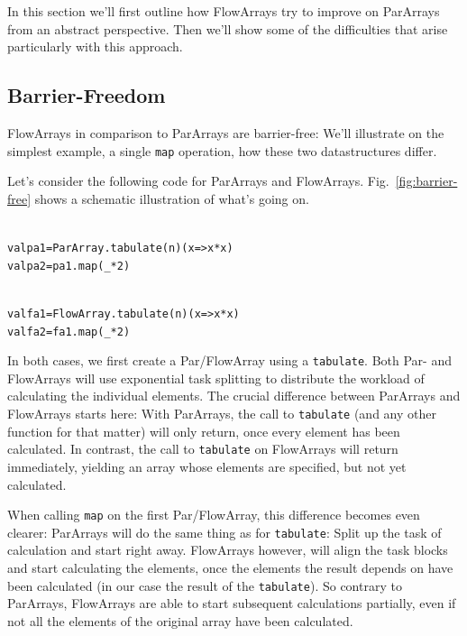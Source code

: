\documentclass[runningheads,a4paper,fleqn]{llncs}
\begin{document}
In this section we'll first outline how FlowArrays try to improve on
ParArrays from an abstract perspective. Then we'll show some of the
difficulties that arise particularly with this approach.

\subsection{Barrier-Freedom}
FlowArrays in comparison to ParArrays are barrier-free: We'll
illustrate on the simplest example, a single \texttt{map}
operation, how these two datastructures differ.

Let's consider the following code for ParArrays and
FlowArrays. Fig.~\ref{fig:barrier-free} shows a schematic
illustration of what's going on.

\noindent
\begin{minipage}[t]{.5\textwidth}
\begin{alltt}
{\scriptsize
val pa1 = ParArray.tabulate(n)(x => x*x)
val pa2 = pa1.map(_ * 2)
}
\end{alltt}
\end{minipage}
\begin{minipage}[t]{.5\textwidth}
\begin{alltt}
{\scriptsize
val fa1 = FlowArray.tabulate(n)(x => x*x)
val fa2 = fa1.map(_ * 2)
}
\end{alltt}
\end{minipage}

In both cases, we first create a Par/FlowArray using a
\texttt{tabulate}. Both Par- and FlowArrays will use exponential task
splitting \cite{collect11,cong08} to distribute the workload of
calculating the individual elements. The crucial difference between
ParArrays and FlowArrays starts here: With ParArrays, the call to
\texttt{tabulate} (and any other function for that matter) will only
return, once every element has been calculated. In contrast, the call
to \texttt{tabulate} on FlowArrays will return immediately, yielding
an array whose elements are specified, but not yet calculated.

When calling \texttt{map} on the first Par/FlowArray, this difference
becomes even clearer: ParArrays will do the same thing as for
\texttt{tabulate}: Split up the task of calculation and start right
away. FlowArrays however, will align the task blocks and start
calculating the elements, once the elements the result depends on have
been calculated (in our case the result of the \texttt{tabulate}). So
contrary to ParArrays, FlowArrays are able to start subsequent
calculations partially, even if not all the elements of the original
array have been calculated.
\end{document}
